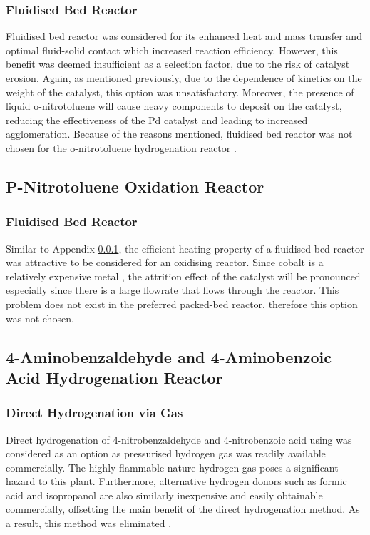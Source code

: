 \subsubsection{Fluidised Bed Reactor}
\label{fbr}
Fluidised bed reactor was considered for its enhanced heat and mass transfer and optimal fluid-solid contact which increased reaction efficiency. However, this benefit was deemed insufficient as a selection factor, due to the risk of catalyst erosion. Again, as mentioned previously, due to the dependence of kinetics on the weight of the catalyst, this option was unsatisfactory. Moreover, the presence of liquid o-nitrotoluene will cause heavy components to deposit on the catalyst, reducing the effectiveness of the Pd catalyst and leading to increased agglomeration. Because of the reasons mentioned, fluidised bed reactor was not chosen for the o-nitrotoluene hydrogenation reactor \cite{farrell_kinetics_1979}.

\subsection{P-Nitrotoluene Oxidation Reactor}
\subsubsection{Fluidised Bed Reactor}
Similar to Appendix \ref{fbr}, the efficient heating property of a fluidised bed reactor was attractive to be considered for an oxidising reactor. Since cobalt is a relatively expensive metal \cite{saib_fundamental_2014}, the attrition effect of the catalyst will be pronounced especially since there is a large flowrate that flows through the reactor. This problem does not exist in the preferred packed-bed reactor, therefore this option was not chosen.

\subsection{4-Aminobenzaldehyde and 4-Aminobenzoic Acid Hydrogenation Reactor}
\subsubsection{Direct Hydrogenation via  Gas}

Direct hydrogenation of 4-nitrobenzaldehyde and 4-nitrobenzoic acid using  was considered as an option as pressurised hydrogen gas was readily available commercially. The highly flammable nature hydrogen gas poses a significant hazard to this plant. Furthermore, alternative hydrogen donors such as formic acid and isopropanol are also similarly inexpensive and easily obtainable commercially, offsetting the main benefit of the direct hydrogenation method. As a result, this method was eliminated \cite{wang_golden_nodate}. 

